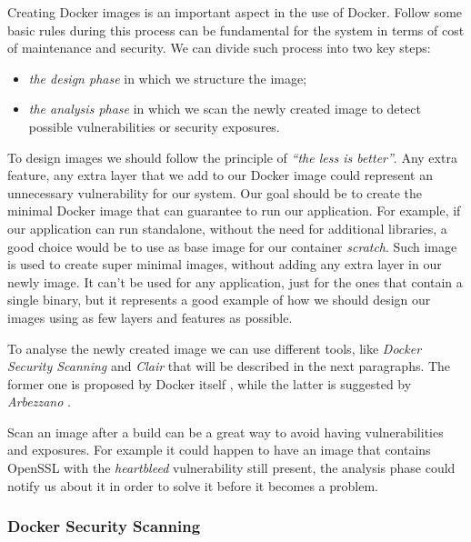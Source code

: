 \documentclass[a4paper,12pt]{article}
\begin{document}
Creating Docker images is an important aspect in the use of Docker. Follow
some basic rules during this process can be fundamental for the system in terms
of cost of maintenance and security. We can divide such process into two key
steps: 
\begin{itemize}
  \item \textit{the design phase} in which we structure the image;
  \item \textit{the analysis phase} in which we scan the newly created image to
  detect possible vulnerabilities or security exposures.
\end{itemize}
To design images we should follow the principle of \textit{``the less is
better''}. Any extra feature, any extra layer that we add to our Docker image
could represent an unnecessary vulnerability for our system. Our goal should be
to create the minimal Docker image that can guarantee to run our application.
For example, if our application can run standalone, without the need for
additional libraries, a good choice would be to use as base image for our
container \textit{scratch}. Such image is used to create super minimal images,
without adding any extra layer in our newly image. It can't be used for any
application, just for the ones that contain a single binary, but it represents a
good example of how we should design our images using as few layers and features
as possible. \par To analyse the newly created image we can use different tools,
like \textit{Docker Security Scanning} and \textit{Clair} that will be described
in the next paragraphs. The former one is proposed by Docker itself
\cite{docker_security_scanning}, while the latter is suggested by
\textit{Arbezzano} \cite[Sec.~1.10]{arbezzano_play_safe}. \par Scan an image
after a build can be a great way to avoid having vulnerabilities and exposures.
For example it could happen to have an image that contains OpenSSL with the
\textit{heartbleed} vulnerability still present, the analysis phase could notify
us about it in order to solve it before it becomes a problem. 

\subsubsection{Docker Security Scanning}
\end{document}
